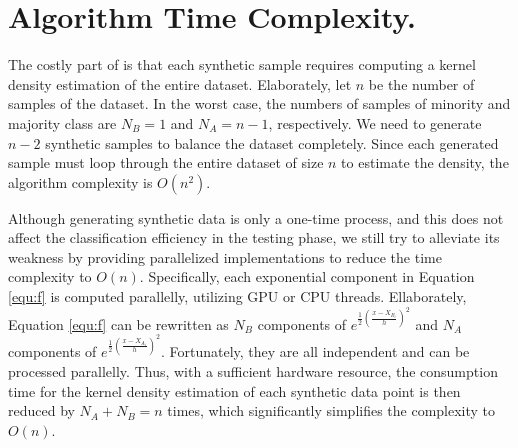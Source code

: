 



\section{Algorithm Time Complexity.}
\label{sec:implementation}


\iffalse
Our proposed technique is straightforward in implementation. We first train a neural network model with initial samples and start querying the next batches of data based on the entropy scores from the previous model to find informative samples. The model is then updated with new batches of data until the entropy scores reach a certain threshold. All the informative samples are then balanced first, and the remaining data are balanced later. Each synthetic data point is generated by finding local maxima in Equation \ref{equ:f}.
\fi

The costly part of \Methodname{} is that each synthetic sample requires computing a kernel density estimation of the entire dataset. Elaborately, let $n$ be the number of samples of the dataset. In the worst case, the numbers of samples of minority and majority class are $N_B = 1$ and $N_A = n-1$, respectively. We need to generate $n-2$ synthetic samples to balance the dataset completely. Since each generated sample must loop through the entire dataset of size $n$ to estimate the density, the algorithm complexity is $O(n^2)$. 

Although generating synthetic data is only a one-time process, and this does not affect the classification efficiency in the testing phase, we still try to alleviate its weakness by providing parallelized implementations to reduce the time complexity to $O(n)$. Specifically, each exponential component in Equation \ref{equ:f} is computed parallelly, utilizing GPU or CPU threads. Ellaborately, Equation \ref{equ:f} can be rewritten as $N_B$ components of $e^{\frac{1}{2} (\frac {x - X_{B_i}}{h})^2}$ and $N_A$ components of $e^{\frac{1}{2} (\frac {x - X_{A_i}}{h})^2}$. Fortunately, they are all independent and can be processed parallelly. Thus, with a sufficient hardware resource, the consumption time for the kernel density estimation of each synthetic data point is then reduced by $N_A+N_B=n$ times, which significantly simplifies the complexity to $O(n)$.

